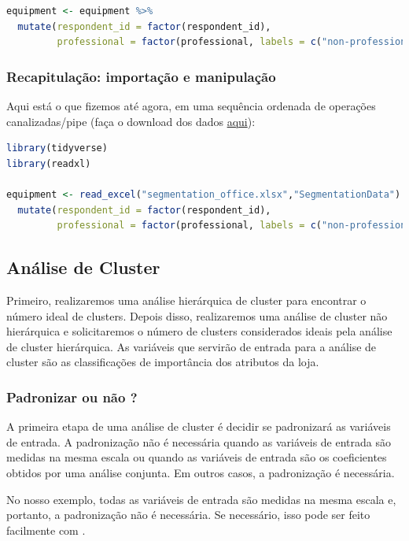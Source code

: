 \documentclass{article}
\begin{document}
\begin{lstlisting}[language=R]
equipment <- equipment %>% 
  mutate(respondent_id = factor(respondent_id),
         professional = factor(professional, labels = c("non-professional","professional")))
\end{lstlisting}

\subsubsection{Recapitulação: importação e manipulação}

Aqui está o que fizemos até agora, em uma sequência ordenada de operações canalizadas/pipe (faça o download dos dados \href{http://users.telenet.be/samuelfranssens/tutorial_data/segmentation_office.xlsx}{aqui}):

\begin{lstlisting}[language=R]
library(tidyverse) 
library(readxl)

equipment <- read_excel("segmentation_office.xlsx","SegmentationData") %>%
  mutate(respondent_id = factor(respondent_id),
         professional = factor(professional, labels = c("non-professional","professional")))
\end{lstlisting}


\subsection{Análise de Cluster}

Primeiro, realizaremos uma análise hierárquica de cluster para encontrar o número ideal de clusters. Depois disso, realizaremos uma análise de cluster não hierárquica e solicitaremos o número de clusters considerados ideais pela análise de cluster hierárquica. As variáveis que servirão de entrada para a análise de cluster são as classificações de importância dos atributos da loja.

\subsubsection{Padronizar ou não ?}

A primeira etapa de uma análise de cluster é decidir se padronizará as variáveis de entrada. A padronização não é necessária quando as variáveis de entrada são medidas na mesma escala ou quando as variáveis de entrada são os coeficientes obtidos por uma análise conjunta. Em outros casos, a padronização é necessária.

No nosso exemplo, todas as variáveis de entrada são medidas na mesma escala e, portanto, a padronização não é necessária. Se necessário, isso pode ser feito facilmente com .
\end{document}
